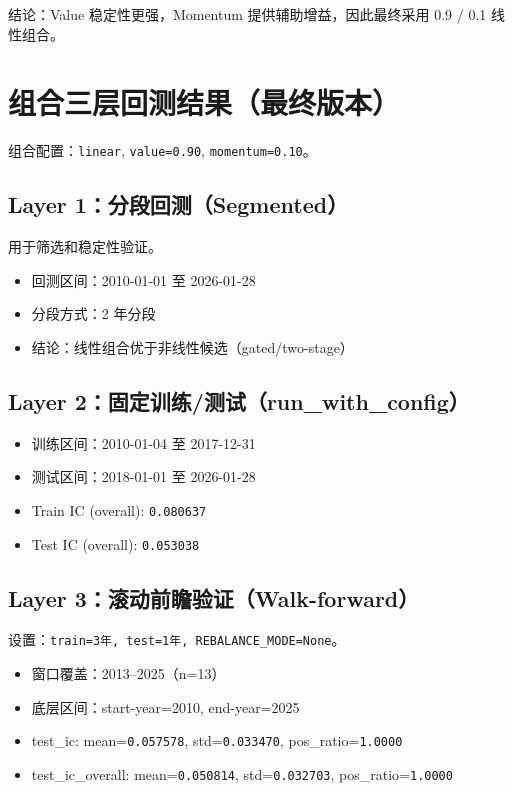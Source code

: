 \documentclass[12pt,a4paper,fontset=fandol]{ctexart}
\begin{document}
结论：Value 稳定性更强，Momentum 提供辅助增益，因此最终采用 0.9 / 0.1 线性组合。

\section{组合三层回测结果（最终版本）}
组合配置：\texttt{linear}, \texttt{value=0.90}, \texttt{momentum=0.10}。

\subsection*{Layer 1：分段回测（Segmented）}
用于筛选和稳定性验证。
\begin{itemize}
  \item 回测区间：2010-01-01 至 2026-01-28
  \item 分段方式：2 年分段
  \item 结论：线性组合优于非线性候选（gated/two-stage）
\end{itemize}

\subsection*{Layer 2：固定训练/测试（run\_with\_config）}
\begin{itemize}
  \item 训练区间：2010-01-04 至 2017-12-31
  \item 测试区间：2018-01-01 至 2026-01-28
\end{itemize}
\begin{itemize}
  \item Train IC (overall): \texttt{0.080637}
  \item Test IC (overall): \texttt{0.053038}
\end{itemize}

\subsection*{Layer 3：滚动前瞻验证（Walk-forward）}
设置：\texttt{train=3年, test=1年, REBALANCE\_MODE=None}。
\begin{itemize}
  \item 窗口覆盖：2013--2025（n=13）
  \item 底层区间：start-year=2010, end-year=2025
\end{itemize}
\begin{itemize}
  \item test\_ic: mean=\texttt{0.057578}, std=\texttt{0.033470}, pos\_ratio=\texttt{1.0000}
  \item test\_ic\_overall: mean=\texttt{0.050814}, std=\texttt{0.032703}, pos\_ratio=\texttt{1.0000}
\end{itemize}
\end{document}
